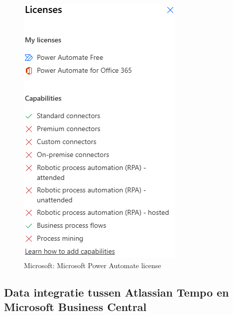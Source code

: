 \begin{figure}[H]
    \centering
    \includegraphics[]{../bachproef/images/Microsoft_License.png}
    \caption{Microsoft: Microsoft Power Automate license}
\end{figure}

\subsection{Data integratie tussen Atlassian Tempo en Microsoft Business Central}
\label{ch:Microsoft1}

